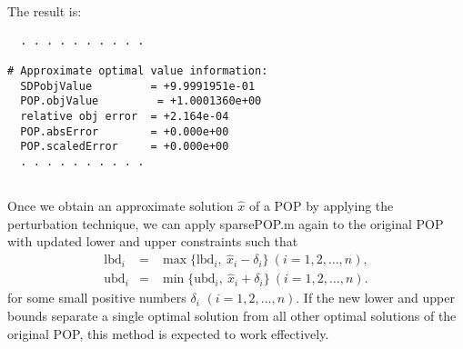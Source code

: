 The result is: 
\begin{verbatim}
  . . . . . . . . . .

# Approximate optimal value information:
  SDPobjValue         = +9.9991951e-01
  POP.objValue         = +1.0001360e+00
  relative obj error  = +2.164e-04
  POP.absError        = +0.000e+00
  POP.scaledError     = +0.000e+00
  . . . . . . . . . .
  
\end{verbatim}
Once we obtain an approximate solution $\hat{x}$ of a POP  by applying the 
perturbation technique, we can apply sparsePOP.m again to the original POP with updated 
lower and upper constraints 
such that 
\begin{eqnarray*}
\mbox{lbd}_i & = & \max\{ \mbox{lbd}_i, \ \hat{x}_i - \delta_i \} \ (i=1,2,\ldots,n), \\ 
\mbox{ubd}_i & = & \min\{ \mbox{ubd}_i, \ \hat{x}_i + \delta_i \} \ (i=1,2,\ldots,n). 
\end{eqnarray*}
for some small positive numbers $\delta_i$ $(i=1,2,\ldots,n)$. If the new lower and 
upper bounds separate a single optimal solution from all other optimal solutions of 
the original POP, this method is expected to work effectively. 
